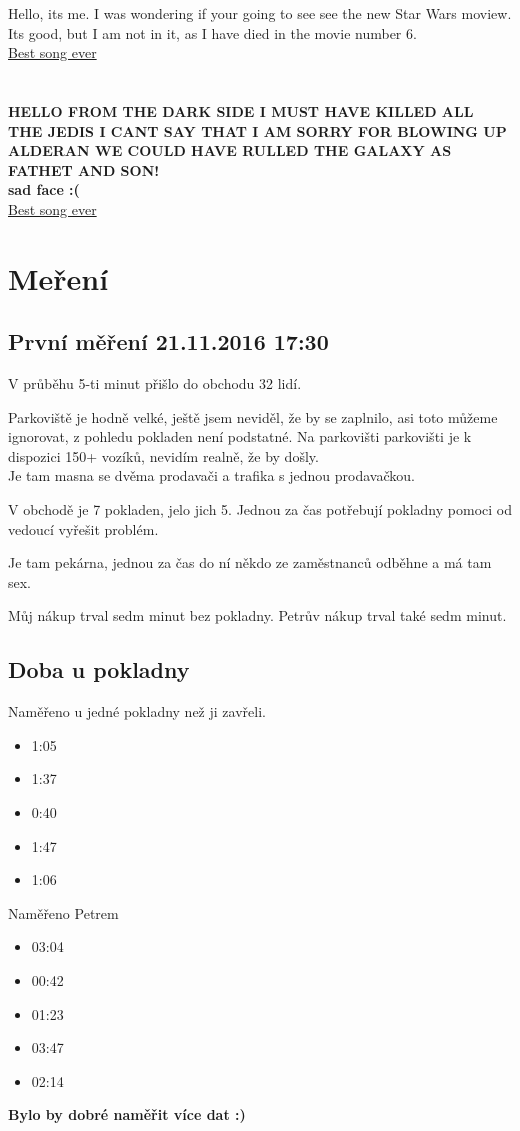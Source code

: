 \documentclass[12pt,a4paper]{report}
\begin{document}
Hello, its me. I was wondering if your going to see see the new Star Wars moview. Its good, but I am not in it, as I have died  in the movie number 6.\\ 
	\href{https://www.youtube.com/watch?v=aSf2C1Pd2Ns}{Best song ever}
\\ \\ \\ 

	\textbf{HELLO FROM THE DARK SIDE
	I MUST HAVE KILLED ALL THE JEDIS
	I CANT SAY THAT I AM SORRY FOR BLOWING UP ALDERAN
	WE COULD HAVE RULLED THE GALAXY AS FATHET AND SON! \\ sad face :(} \\
	\href{https://www.youtube.com/watch?v=UAMyh8DjCrQ}{Best song ever}

\chapter{Meření}
\section{První měření 21.11.2016 17:30}
V průběhu 5-ti minut přišlo do obchodu 32 lidí.

Parkoviště je hodně velké, ještě jsem neviděl, že by se zaplnilo, asi toto můžeme ignorovat, z pohledu pokladen není podstatné.
Na parkovišti parkovišti je k dispozici 150+ vozíků, nevidím realně, že by došly.
\\
Je tam masna se dvěma prodavači a trafika s jednou prodavačkou.

V obchodě je 7 pokladen, jelo jich 5. Jednou za čas potřebují pokladny pomoci od vedoucí vyřešit problém.

Je tam pekárna, jednou za čas do ní někdo ze zaměstnanců odběhne a má tam sex.

Můj nákup trval sedm minut bez pokladny. Petrův nákup trval také sedm minut.

\section{Doba u pokladny}
Naměřeno u jedné pokladny než ji zavřeli.
\begin{itemize}
\item 1:05
\item 1:37
\item 0:40
\item 1:47
\item 1:06
\end{itemize}
Naměřeno Petrem
\begin{itemize}
\item 03:04
\item 00:42
\item 01:23
\item 03:47
\item 02:14
\end{itemize}


\textbf{Bylo by dobré naměřit více dat :) }
\end{document}
